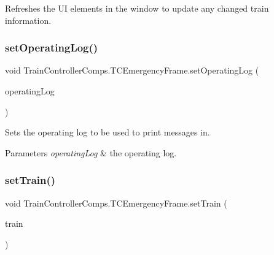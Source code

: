 Refreshes the UI elements in the window to update any changed train information. 

\mbox{\label{classTrainControllerComps_1_1TCEmergencyFrame_a976ebb5248e43db7b076148f1d1e8f0b}} 
\subsubsection{\texorpdfstring{set\+Operating\+Log()}{setOperatingLog()}}
{\footnotesize\ttfamily void Train\+Controller\+Comps.\+T\+C\+Emergency\+Frame.\+set\+Operating\+Log (\begin{DoxyParamCaption}\item[{J\+Text\+Area}]{operating\+Log }\end{DoxyParamCaption})}



Sets the operating log to be used to print messages in. 


\begin{DoxyParams}{Parameters}
{\em operating\+Log} & the operating log. \\
\hline
\end{DoxyParams}
\mbox{\label{classTrainControllerComps_1_1TCEmergencyFrame_a61d8cb274f6be974634700dd6eee045c}} 
\subsubsection{\texorpdfstring{set\+Train()}{setTrain()}}
{\footnotesize\ttfamily void Train\+Controller\+Comps.\+T\+C\+Emergency\+Frame.\+set\+Train (\begin{DoxyParamCaption}\item[{\hyperlink{classTrainControllerComps_1_1TestTrain}{Test\+Train}}]{train }\end{DoxyParamCaption})}



